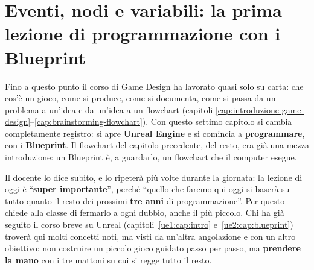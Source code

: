 \chapter[Eventi, nodi e variabili]{Eventi, nodi e variabili: la prima
lezione di programmazione con i Blueprint}
\label{gd7:cap:blueprint}

Fino a questo punto il corso di Game Design ha lavorato quasi solo su carta:
che cos'è un gioco, come si produce, come si documenta, come si passa da un
problema a un'idea e da un'idea a un flowchart (capitoli
\ref{cap:introduzione-game-design}--\ref{cap:brainstorming-flowchart}). Con
questo settimo capitolo si cambia completamente registro: si apre
\textbf{Unreal Engine} e si comincia a \textbf{programmare}, con i
\textbf{Blueprint}. Il flowchart del capitolo precedente, del resto, era già
una mezza introduzione: un Blueprint è, a guardarlo, un flowchart che il
computer esegue.

Il docente lo dice subito, e lo ripeterà più volte durante la giornata: la
lezione di oggi è ``\textbf{super importante}'', perché ``quello che faremo
qui oggi si baserà su tutto quanto il resto dei prossimi \textbf{tre anni} di
programmazione''. Per questo chiede alla classe di fermarlo a ogni dubbio,
anche il più piccolo. Chi ha già seguito il corso breve su Unreal
(capitoli~\ref{ue1:cap:intro} e~\ref{ue2:cap:blueprint}) troverà qui molti
concetti noti, ma visti da un'altra angolazione e con un altro obiettivo: non
costruire un piccolo gioco guidato passo per passo, ma \textbf{prendere la
mano} con i tre mattoni su cui si regge tutto il resto.

